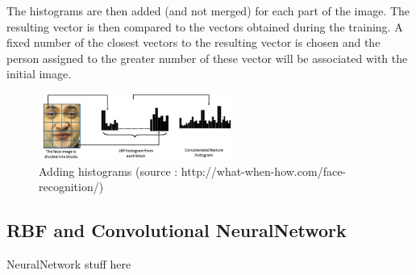 The histograms are then added (and not merged) for each part of the image. The resulting vector is then compared to the vectors obtained during the training. A fixed number of the closest vectors to the resulting vector is chosen and the person assigned to the greater number of these vector will be associated with the initial image.

\begin{figure}[ht]
\centering
\includegraphics[width=2.5in]{rsrc/LBPH2.png}
\caption{Adding histograms (source : http://what-when-how.com/face-recognition/)}
\label{Adding histograms}
\end{figure}

\subsection{RBF and Convolutional NeuralNetwork}

NeuralNetwork stuff here
